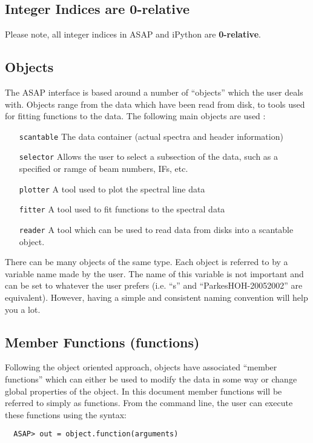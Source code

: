 \documentclass[11pt]{article}
\newcommand{\cmd}[1]{{\tt #1}}
\begin{document}
\subsection {Integer Indices are 0-relative}

Please note, all integer indices in ASAP and iPython are {\bf 0-relative}.

\subsection{Objects}
The ASAP interface is based around a number of ``objects'' which the
user deals with. Objects range from the data which have been read from
disk, to tools used for fitting functions to the data. The following
main objects are used :

\begin{itemize}
  \item[\cmd{scantable}] The data container (actual spectra and header
    information)
  \item[\cmd{selector}] Allows the user to select a subsection of the
    data, such as a specified or ramge of beam numbers, IFs, etc.
  \item[\cmd{plotter}] A tool used to plot the spectral line data
  \item[\cmd{fitter}] A tool used to fit functions to the spectral data
  \item[\cmd{reader}] A tool which can be used to read data from disks
    into a scantable object.
\end{itemize}

There can be many objects of the same type. Each object is referred to
by a variable name made by the user. The name of this variable is not
important and can be set to whatever the user prefers (i.e. ``s'' and
``ParkesHOH-20052002'' are equivalent).  However, having a simple and
consistent naming convention will help you a lot.

\subsection{Member Functions (functions)}

Following the object oriented approach,
objects have associated ``member functions'' which can either be used
to modify the data in some way or change global properties of the
object. In this document member functions will be referred to simply
as functions. From the command line, the user can execute these
functions using the syntax:
\begin{verbatim}
  ASAP> out = object.function(arguments)
\end{verbatim}
\end{document}
